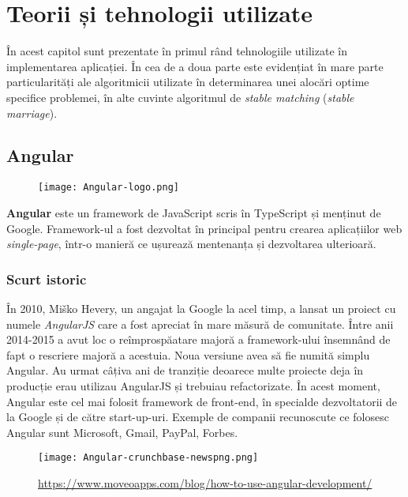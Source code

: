 \chapter{Teorii și tehnologii utilizate}

În acest capitol sunt prezentate în primul rând tehnologiile utilizate în implementarea aplicației. În cea de a doua parte este evidențiat în mare parte particularități ale algoritmicii utilizate în determinarea unei alocări optime specifice problemei, în alte cuvinte algoritmul de \textit{stable matching} (\textit{stable marriage}).

\section{Angular}
\begin{figure}[H]
	\texttt{[image: Angular-logo.png]}
\end{figure}

\textbf{Angular} este un framework de JavaScript scris în TypeScript și menținut de Google. Framework-ul a fost dezvoltat în principal pentru crearea aplicațiilor web \textit{single-page}, într-o manieră ce ușurează mentenanța și dezvoltarea ulterioară.

\subsection{Scurt istoric}
În 2010, Miško Hevery, un angajat la Google la acel timp, a lansat un proiect cu numele \textit{AngularJS} care a fost apreciat în mare măsură de comunitate. Între anii 2014-2015 a avut loc o reîmprospăatare majoră a framework-ului însemnând de fapt o rescriere majoră a acestuia. Noua versiune avea să fie numită simplu Angular. Au urmat câțiva ani de tranziție deoarece multe proiecte deja în producție erau utilizau AngularJS și  trebuiau refactorizate. În acest moment, Angular este cel mai folosit framework de front-end, în specialde dezvoltatorii de la Google și de către start-up-uri. Exemple de companii recunoscute ce folosesc Angular sunt Microsoft, Gmail, PayPal, Forbes.

\begin{figure}[H]
	\centering
	\texttt{[image: Angular-crunchbase-newspng.png]}
	\caption{\url{https://www.moveoapps.com/blog/how-to-use-angular-development/}}
\end{figure}

